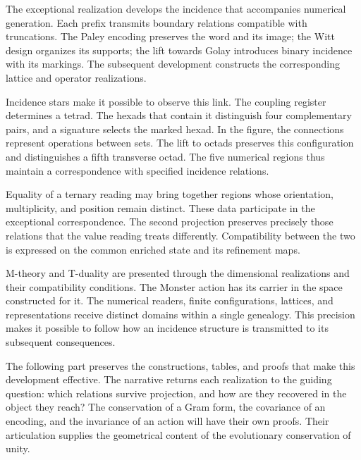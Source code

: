 
The exceptional realization develops the incidence that accompanies
numerical generation. Each prefix transmits boundary relations compatible
with truncations. The Paley encoding preserves the word and its image;
the Witt design organizes its supports; the lift towards Golay introduces
binary incidence with its markings. The subsequent development constructs
the corresponding lattice and operator realizations.

Incidence stars make it possible to observe this link. The coupling
register determines a tetrad. The hexads that contain it distinguish four
complementary pairs, and a signature selects the marked hexad. In the
figure, the connections represent operations between sets. The lift to
octads preserves this configuration and distinguishes a fifth transverse
octad. The five numerical regions thus maintain a correspondence with
specified incidence relations.

Equality of a ternary reading may bring together regions whose
orientation, multiplicity, and position remain distinct. These data
participate in the exceptional correspondence. The second projection
preserves precisely those relations that the value reading treats
differently. Compatibility between the two is expressed on the common
enriched state and its refinement maps.

M-theory and T-duality are presented through the dimensional realizations
and their compatibility conditions. The Monster action has its carrier in
the space constructed for it. The numerical readers, finite
configurations, lattices, and representations receive distinct domains
within a single genealogy. This precision makes it possible to follow how
an incidence structure is transmitted to its subsequent consequences.

The following part preserves the constructions, tables, and proofs that
make this development effective. The narrative returns each realization
to the guiding question: which relations survive projection, and how are
they recovered in the object they reach? The conservation of a Gram form,
the covariance of an encoding, and the invariance of an action will have
their own proofs. Their articulation supplies the geometrical content of
the evolutionary conservation of unity.
